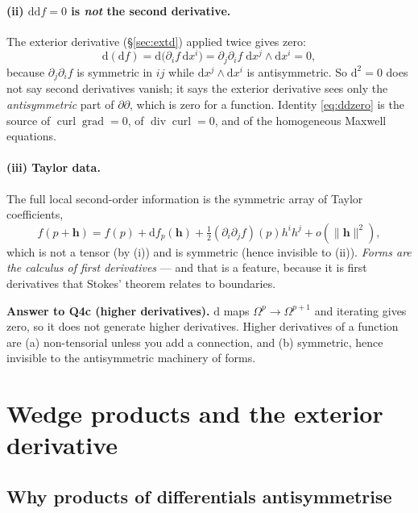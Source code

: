 \documentclass[10pt,a4paper]{article}
\newcommand{\dd}{\mathrm{d}}
\newcommand{\Om}{\Omega}
\newcommand{\hh}{\mathbf{h}}
\DeclareMathOperator{\grad}{grad}
\DeclareMathOperator{\curl}{curl}
\DeclareMathOperator{\dive}{div}
\theoremstyle{plain}
\theoremstyle{definition}
\numberwithin{equation}{section}
\begin{document}
\paragraph{(ii) $\dd\dd f=0$ is \emph{not} the second derivative.} The exterior derivative
(\S\ref{sec:extd}) applied twice gives zero:
\begin{equation}
\dd(\dd f)=\dd\big(\partial_if\,\dd x^i\big)=\partial_j\partial_if\;\dd x^j\wedge\dd x^i=0 ,
\label{eq:ddzero}
\end{equation}
because $\partial_j\partial_if$ is symmetric in $ij$ while $\dd x^j\wedge\dd x^i$ is
antisymmetric. So $\dd^2=0$ does not say second derivatives vanish; it says the exterior
derivative sees only the \emph{antisymmetric} part of $\partial\partial$, which is zero for a
function. Identity \eqref{eq:ddzero} is the source of $\curl\grad=0$, of $\dive\curl=0$, and of
the homogeneous Maxwell equations.

\paragraph{(iii) Taylor data.} The full local second-order information is the symmetric array
of Taylor coefficients,
\begin{equation}
f(p+\hh)=f(p)+\dd f_p(\hh)+\tfrac12(\partial_i\partial_jf)(p)h^ih^j+o(\|\hh\|^2),
\end{equation}
which is not a tensor (by (i)) and is symmetric (hence invisible to (ii)). \emph{Forms are the
calculus of first derivatives} --- and that is a feature, because it is first derivatives that
Stokes' theorem relates to boundaries.

\begin{keybox}
\textbf{Answer to Q4c (higher derivatives).} $\dd$ maps $\Om^p\to\Om^{p+1}$ and iterating gives
zero, so it does not generate higher derivatives. Higher derivatives of a function are
(a) non-tensorial unless you add a connection, and (b) symmetric, hence invisible to the
antisymmetric machinery of forms.
\end{keybox}


\section{Wedge products and the exterior derivative}
\label{sec:grassmann}

\subsection{Why products of differentials antisymmetrise}
\end{document}
